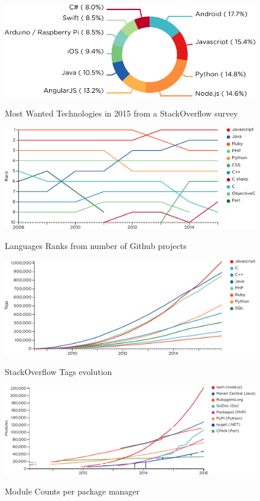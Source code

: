 \begin{figure}[h!]
  \centering
  \includegraphics[width=0.7\linewidth]{../resources/stackoverflow-mostwanted.pdf}
  \label{fig:so-tags}
  \caption{Most Wanted Technologies in 2015 from a StackOverflow survey}
\end{figure}

\begin{figure}[h!]
  \centering
  \includegraphics[width=\linewidth]{../resources/github-languages.pdf}
  \label{fig:github-languages}
  \caption{Languages Ranks from number of Github projects}
\end{figure}

\begin{figure}[h!]
  \centering
  \includegraphics[width=\linewidth]{../resources/stackoverflow-tags.pdf}
  \label{fig:so-tags}
  \caption{StackOverflow Tags evolution}
\end{figure}

\begin{figure}[h!]
  \centering
  \includegraphics[width=\linewidth]{../resources/modulecounts.pdf}
  \label{fig:modulecounts}
  \caption{Module Counts per package manager}    
\end{figure}


